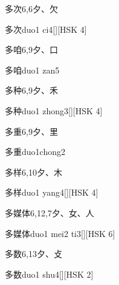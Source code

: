 \begin{entry}{多次}{6,6}{⼣、⽋}
  \begin{phonetics}{多次}{duo1 ci4}[][HSK 4]
  \end{phonetics}
\end{entry}

\begin{entry}{多咱}{6,9}{⼣、⼝}
  \begin{phonetics}{多咱}{duo1 zan5}
  \end{phonetics}
\end{entry}

\begin{entry}{多种}{6,9}{⼣、⽲}
  \begin{phonetics}{多种}{duo1 zhong3}[][HSK 4]
  \end{phonetics}
\end{entry}

\begin{entry}{多重}{6,9}{⼣、⾥}
  \begin{phonetics}{多重}{duo1chong2}
  \end{phonetics}
\end{entry}

\begin{entry}{多样}{6,10}{⼣、⽊}
  \begin{phonetics}{多样}{duo1 yang4}[][HSK 4]
  \end{phonetics}
\end{entry}

\begin{entry}{多媒体}{6,12,7}{⼣、⼥、⼈}
  \begin{phonetics}{多媒体}{duo1 mei2 ti3}[][HSK 6]
  \end{phonetics}
\end{entry}

\begin{entry}{多数}{6,13}{⼣、⽁}
  \begin{phonetics}{多数}{duo1 shu4}[][HSK 2]
  \end{phonetics}
\end{entry}


